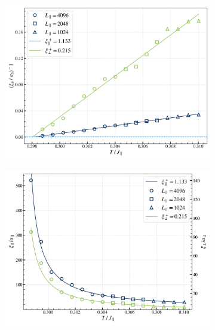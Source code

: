 	\begin{figure}[htp]
		\begin{subfigure}{0.475\textwidth}
			\centering
			\includegraphics[width=0.95\linewidth]{graphics/xi-inv-divergence-30-3.png}
		\end{subfigure}
		\begin{subfigure}{0.475\textwidth}
			\centering
			\includegraphics[width=0.95\linewidth]{graphics/xi-divergence-30-3.png}
		\end{subfigure} \\ 
		\begin{subfigure}{0.475\textwidth}

\end{subfigure}
\end{figure}
